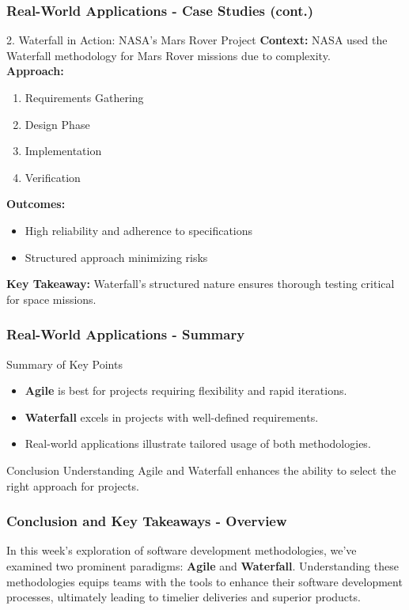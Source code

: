\documentclass{beamer}
\begin{document}
\begin{frame}[fragile]
    \frametitle{Real-World Applications - Case Studies (cont.)}
    \begin{block}{2. Waterfall in Action: NASA's Mars Rover Project}
        \textbf{Context:} NASA used the Waterfall methodology for Mars Rover missions due to complexity.\\
        \textbf{Approach:}
        \begin{enumerate}
            \item Requirements Gathering
            \item Design Phase
            \item Implementation
            \item Verification
        \end{enumerate}
        \textbf{Outcomes:}
        \begin{itemize}
            \item High reliability and adherence to specifications
            \item Structured approach minimizing risks
        \end{itemize}
        \textbf{Key Takeaway:} Waterfall's structured nature ensures thorough testing critical for space missions.
    \end{block}
\end{frame}

\begin{frame}[fragile]
    \frametitle{Real-World Applications - Summary}
    \begin{block}{Summary of Key Points}
        \begin{itemize}
            \item \textbf{Agile} is best for projects requiring flexibility and rapid iterations.
            \item \textbf{Waterfall} excels in projects with well-defined requirements.
            \item Real-world applications illustrate tailored usage of both methodologies.
        \end{itemize}
    \end{block}

    \begin{block}{Conclusion}
        Understanding Agile and Waterfall enhances the ability to select the right approach for projects.
    \end{block}
\end{frame}

\begin{frame}[fragile]
    \frametitle{Conclusion and Key Takeaways - Overview}
    In this week's exploration of software development methodologies, we've examined two prominent paradigms: 
    \textbf{Agile} and \textbf{Waterfall}. Understanding these methodologies equips teams with the tools to enhance their software development processes, ultimately leading to timelier deliveries and superior products.
\end{frame}
\end{document}
